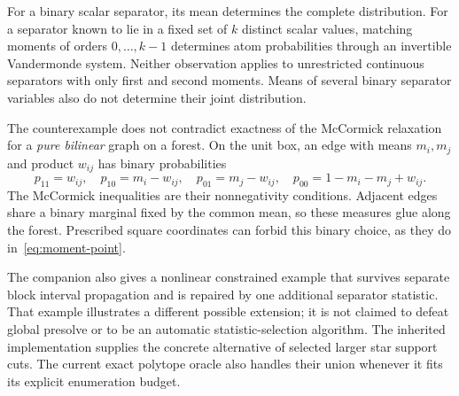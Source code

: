 For a binary scalar separator, its mean determines the complete
distribution. For a separator known to lie in a fixed set of $k$
distinct scalar values, matching moments of orders $0,\ldots,k-1$
determines atom probabilities through an invertible Vandermonde system.
Neither observation applies to unrestricted continuous separators with
only first and second moments. Means of several binary separator
variables also do not determine their joint distribution.

The counterexample does not contradict exactness of the McCormick
relaxation for a \emph{pure bilinear} graph on a forest. On the unit
box, an edge with means $m_i,m_j$ and product $w_{ij}$ has binary
probabilities
\[
p_{11}=w_{ij},\quad p_{10}=m_i-w_{ij},\quad
p_{01}=m_j-w_{ij},\quad p_{00}=1-m_i-m_j+w_{ij}.
\]
The McCormick inequalities are their nonnegativity conditions. Adjacent
edges share a binary marginal fixed by the common mean, so these
measures glue along the forest. Prescribed square coordinates can
forbid this binary choice, as they do in~\eqref{eq:moment-point}.

The companion
also gives a nonlinear constrained example that survives separate
block interval propagation and is repaired by one additional separator
statistic. That example illustrates a different possible extension;
it is not claimed to defeat global presolve or to be an automatic
statistic-selection algorithm. The inherited implementation supplies the concrete alternative of
selected larger star support cuts. The current exact polytope oracle also
handles their union whenever it fits its explicit enumeration budget.
